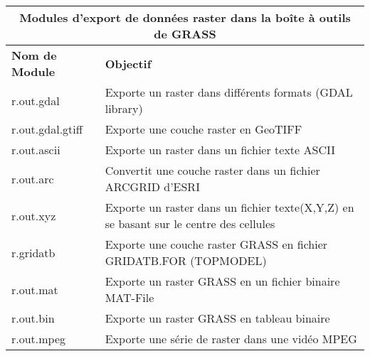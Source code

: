 \begin{table}[htb]
\centering
 \begin{tabular}{|p{2.5cm}|p{11.5cm}|}
  \hline \multicolumn{2}{|c|}{\textbf{Modules d'export de données raster dans la boîte à outils de GRASS}} \\ 
  \hline \textbf{Nom de Module} & \textbf{Objectif} \\
  \hline r.out.gdal & Exporte un raster dans différents formats (GDAL library) \\
  \hline r.out.gdal.gtiff & Exporte une couche raster en GeoTIFF \\
  \hline r.out.ascii & Exporte un raster dans un fichier texte ASCII \\
  \hline r.out.arc & Convertit une couche raster dans un fichier ARCGRID d'ESRI \\
  \hline r.out.xyz & Exporte un raster dans un fichier texte(X,Y,Z) en se basant sur le centre des cellules \\
  \hline r.gridatb & Exporte une couche raster GRASS en fichier GRIDATB.FOR (TOPMODEL) \\
  \hline r.out.mat & Exporte un raster GRASS en un fichier binaire MAT-File \\
  \hline r.out.bin & Exporte un raster GRASS en tableau binaire \\
  \hline r.out.mpeg & Exporte une série de raster dans une vidéo MPEG \\

\end{tabular}
\end{table}
